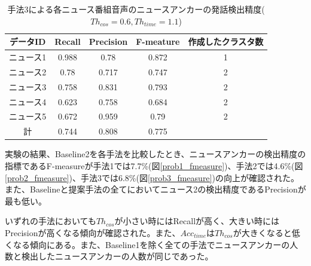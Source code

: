 \begin{table}[H]
  \begin{center}
    \caption{手法3による各ニュース番組音声のニュースアンカーの発話検出精度($Th_{cos}=0.6,Th_{time}=1.1$) \label{table:prob3_eachnews_time}}
    \begin{tabular}{|c||c|c|c|c|} \hline
データID & Recall & Precision & F-meature & 作成したクラスタ数\\ \hline
ニュース1 & 0.988 & 0.78 & 0.872 & 1 \\ \hline
ニュース2 & 0.78 & 0.717 & 0.747 & 2 \\ \hline
ニュース3 & 0.758 & 0.831 & 0.793 & 2 \\ \hline
ニュース4 & 0.623 & 0.758 & 0.684 & 2 \\ \hline
ニュース5 & 0.672 & 0.959 & 0.79 & 2 \\ \hline
計 & 0.744 & 0.808 & 0.775 & \\ \hline
    \end{tabular}
  \end{center}
\end{table}

実験の結果、Baseline2を各手法を比較したとき、ニュースアンカーの検出精度の指標であるF-measureが手法1では7.7\%(図\ref{prob1_fmeasure})、手法2では4.6\%(図\ref{prob2_fmeasure})、手法3では6.8\%(図\ref{prob3_fmeasure})の向上が確認された。また、Baselineと提案手法の全てにおいてニュース2の検出精度であるPrecisionが最も低い。\par
いずれの手法においても$Th_{cos}$が小さい時にはRecallが高く、大きい時にはPrecisionが高くなる傾向が確認された。また、$Acc_{time}$は$Th_{cos}$が大きくなると低くなる傾向にある。また、Baseline1を除く全ての手法でニュースアンカーの人数と検出したニュースアンカーの人数が同じであった。\par

